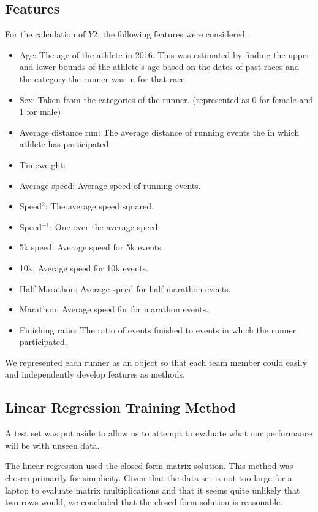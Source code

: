 \documentclass{article}
\begin{document}
\subsection*{Features}
For the calculation of $Y2$, the following features were considered.

\begin{itemize}
    \item Age: The age of the athlete in 2016. This was estimated by finding the upper and lower bounds of the athlete's age
                based on the dates of past races and the category the runner was in for that race.
    \item Sex: Taken from the categories of the runner. (represented as 0 for female and 1 for male)
    \item Average distance run: The average distance of running events the in which athlete has participated.
    \item Timeweight: %
    \item Average speed: Average speed of running events.
    \item Speed$^2$: The average speed squared.
    \item Speed$^{-1}$: One over the average speed. 
    \item 5k speed:  Average speed for 5k events. 
    \item 10k:  Average speed for 10k events.
    \item Half Marathon:  Average speed for half marathon events.
    \item Marathon: Average speed for for marathon events.
    \item Finishing ratio:  The ratio of events finished to events in which the runner participated. 
\end{itemize}

We represented each runner as an object so that each team member could easily and independently
develop features as methods.

\subsection*{Linear Regression Training Method}

A test set was put aside to allow us to attempt to evaluate what our performance will be with unseen data. 

The linear regression used the closed form matrix solution. This method was chosen primarily for simplicity. 
Given that the data set is not too large for a laptop to evaluate matrix multiplications and that it seems quite 
unlikely that two rows would, we concluded that the closed form solution is reasonable.
\end{document}
